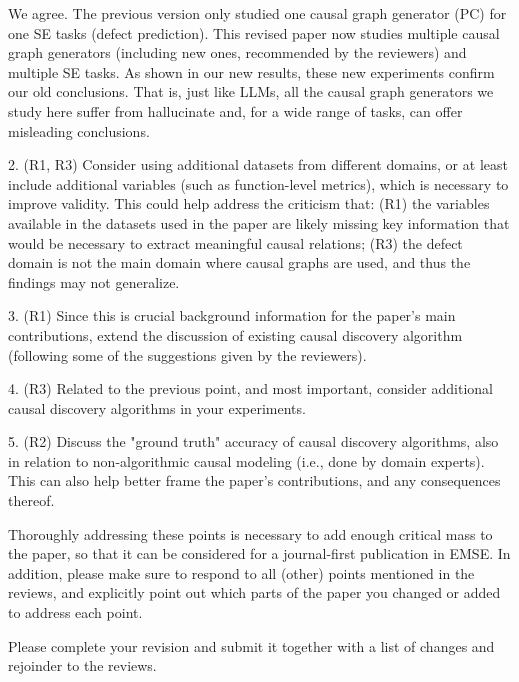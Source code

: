 \documentclass[]{svjour3}
\newif\ifblueresponse
\newcommand{\BLUE}{%
  \begingroup
  \ifblueresponse
    \color{blue}%
  \else
    \color{black}%
  \fi
}
\begin{document}
\BLUE{We agree. The previous version only studied one causal graph generator  (PC) for one SE tasks (defect prediction). This revised paper now studies multiple causal graph generators (including new ones,  recommended by the reviewers) and multiple SE tasks. As shown in our new results, these new experiments confirm
our old conclusions. That is, just like LLMs, all the causal graph generators we study here suffer from hallucinate and, for a wide range of tasks,  can offer misleading conclusions. } 

2. (R1, R3) Consider using additional datasets from different domains, or at least include additional variables (such as function-level metrics), which is necessary to improve validity. This could help address the criticism that: (R1) the variables available in the datasets used in the paper are likely missing key information that would be necessary to extract meaningful causal relations; (R3) the defect domain is not the main domain where causal graphs are used, and thus the findings may not generalize.

3. (R1) Since this is crucial background information for the paper's main contributions, extend the discussion of existing causal discovery algorithm (following some of the suggestions given by the reviewers).

4. (R3) Related to the previous point, and most important, consider additional causal discovery algorithms in your experiments.

5. (R2) Discuss the "ground truth" accuracy of causal discovery algorithms, also in relation to non-algorithmic causal modeling (i.e., done by domain experts). This can also help better frame the paper's contributions, and any consequences thereof.

Thoroughly addressing these points is necessary to add enough critical mass to the paper, so that it can be considered for a journal-first publication in EMSE. In addition, please make sure to respond to all (other) points mentioned in the reviews, and explicitly point out which parts of the paper you changed or added to address each point.

Please complete your revision and submit it together with a list of changes and rejoinder to the reviews.




\end{document}
